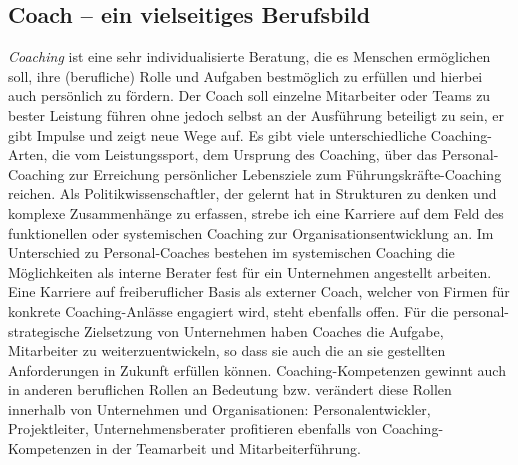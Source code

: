 \documentclass[11pt,a4paper]{article}
\begin{document}
\subsection*{\textsf{Coach -- ein vielseitiges Berufsbild}}


\textsl{Coaching} ist eine sehr individualisierte Beratung, die es Menschen ermöglichen soll, ihre (berufliche) Rolle und Aufgaben bestmöglich zu erfüllen und hierbei auch persönlich zu fördern. Der Coach soll einzelne Mitarbeiter oder Teams zu bester Leistung führen ohne jedoch selbst an der Ausführung beteiligt zu sein, er gibt Impulse und zeigt neue Wege auf. Es gibt viele unterschiedliche Coaching-Arten, die vom Leistungssport, dem Ursprung des Coaching, über das Personal-Coaching zur Erreichung persönlicher Lebensziele zum Führungskräfte-Coaching reichen. Als Politikwissenschaftler, der gelernt hat in Strukturen zu denken und komplexe Zusammenhänge zu erfassen, strebe ich eine Karriere auf dem Feld des funktionellen oder systemischen Coaching zur Organisationsentwicklung an. Im Unterschied zu Personal-Coaches bestehen im systemischen Coaching die Möglichkeiten als interne Berater fest für ein Unternehmen angestellt arbeiten. Eine Karriere auf freiberuflicher Basis als externer Coach, welcher von Firmen für konkrete Coaching-Anlässe engagiert wird, steht ebenfalls offen. Für die personal-strategische Zielsetzung von Unternehmen haben Coaches die Aufgabe, Mitarbeiter zu weiterzuentwickeln, so dass sie auch die an sie gestellten Anforderungen in Zukunft erfüllen können. Coaching-Kompetenzen gewinnt auch in anderen beruflichen Rollen an Bedeutung bzw. verändert diese Rollen innerhalb von Unternehmen und Organisationen: Personalentwickler, Projektleiter, Unternehmensberater profitieren ebenfalls von Coaching-Kompetenzen in der Teamarbeit und Mitarbeiterführung.

\newpage
\end{document}
